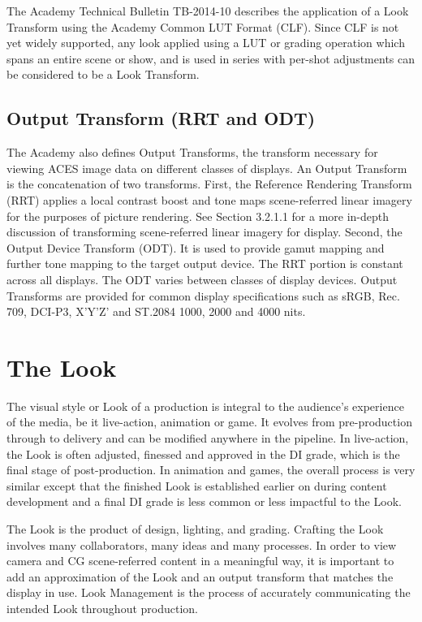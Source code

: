The Academy Technical Bulletin TB-2014-10 describes the application of a Look Transform using the Academy Common LUT Format (CLF). Since CLF is not yet widely supported, any look applied using a LUT or grading operation which spans an entire scene or show, and is used in series with per-shot adjustments can be considered to be a Look Transform.

\subsection{Output Transform (RRT and ODT)}

The Academy also defines Output Transforms, the transform necessary for viewing ACES image data on different classes of displays.  An Output Transform is the concatenation of two transforms. First, the Reference Rendering Transform (RRT) applies a local contrast boost and tone maps scene-referred linear imagery for the purposes of picture rendering. See Section 3.2.1.1 for a more in-depth discussion of transforming scene-referred linear imagery for display. Second, the Output Device Transform (ODT). It is used to provide gamut mapping and further tone mapping to the target output device. The RRT portion is constant across all displays. The ODT varies between classes of display devices. Output Transforms are provided for common display specifications such as sRGB, Rec. 709, DCI-P3, X’Y’Z’ and ST.2084 1000, 2000 and 4000 nits.

\section{The Look}

The visual style or Look of a production is integral to the audience’s experience of the media, be it live-action, animation or game. It evolves from pre-production through to delivery and can be modified anywhere in the pipeline. In live-action, the Look is often adjusted, finessed and approved in the DI grade, which is the final stage of post-production. In animation and games, the overall process is very similar except that the finished Look is established earlier on during content development and a final DI grade is less common or less impactful to the Look.

The Look is the product of design, lighting, and grading. Crafting the Look involves many collaborators, many ideas and many processes. In order to view camera and CG scene-referred content in a meaningful way, it is important to add an approximation of the Look and an output transform that matches the display in use. Look Management is the process of accurately communicating the intended Look throughout production.

